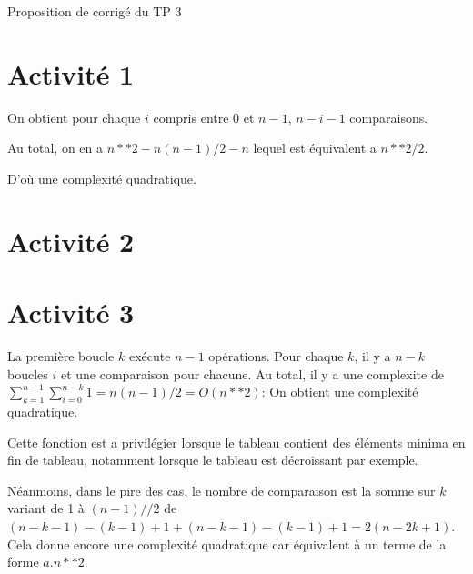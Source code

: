 
	
\begin{Large}
	Proposition de corrigé du TP 3
\end{Large}


\section*{Activité 1}



\eject 



On obtient pour chaque $i$ compris entre 0 et $n-1$, $n-i-1$ comparaisons.

Au total, on en a $n**2-n(n-1)/2-n$ lequel est équivalent a $n**2/2$.

D'où une complexité quadratique.


\eject

\section*{Activité 2}


\vspace{3.5cm}

\eject \section*{Activité 3}



La première boucle $k$ ex\'ecute $n-1$ opérations. Pour chaque $k$, il y a $n-k$ boucles $i$ et une comparaison pour chacune. Au total, il y a une complexite de $\displaystyle\sum_{k=1}^{n-1}\sum_{i=0}^{n-k} 1 =n(n-1)/2 = O(n**2)$:
On obtient une complexité quadratique.



Cette fonction est a privilégier lorsque le tableau contient des éléments minima en fin de tableau, notamment lorsque le tableau est décroissant par exemple.

Néanmoins, dans le pire des cas, le nombre de comparaison est la somme sur $k$ variant de 1 à $(n-1)//2$ de $(n-k-1)-(k-1)+1+(n-k-1)-(k-1)+1=2(n-2k+1)$. Cela donne encore une complexité quadratique car équivalent à un terme de la forme $a.n**2$.



